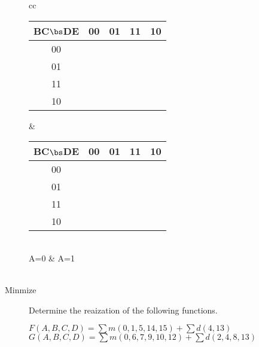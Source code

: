 \begin{description}
\begin{tabular}{cc}
            \begin{tabular} {c||c|c|c|c}
                BC$\bs$DE & 00 & 01 & 11 & 10 \\ \hline \hline
                00        &    &    &    &    \\ \hline
                01        &    &    &    &    \\ \hline
                11        &    &    &    &    \\ \hline
                10        &    &    &    &    \\
            \end{tabular}        &
            \begin{tabular} {c||c|c|c|c}
                BC$\bs$DE & 00 & 01 & 11 & 10 \\ \hline \hline
                00        &    &    &    &    \\ \hline
                01        &    &    &    &    \\ \hline
                11        &    &    &    &    \\ \hline
                10        &    &    &    &    \\
            \end{tabular}        \\
            A=0 & A=1             \\
             \vspace{0.2in}    \\
        \end{tabular}

    \item[Minmize]  Determine the \SOPmin reaization of the following functions.

        \begin{description}
            \item[$F(A,B,C,D) = \sum m(0,1,5,14,15) + \sum d(4,13)$    ]
            \item[$G(A,B,C,D) = \sum m(0,6,7,9,10,12)+\sum d(2,4,8,13)$            ]
        \end{description}


\end{description}
